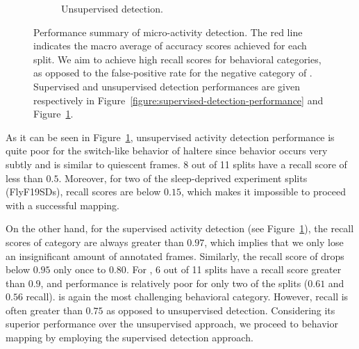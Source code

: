\begin{figure}[htb!]
\begin{subfigure}[b]{0.495\linewidth}
		\caption{Unsupervised detection. \label{figure:unsupervised-detection-performance}}
	\end{subfigure}%
	\caption[Performance summary of micro-activity detection.]{Performance summary of micro-activity detection.
		The red line indicates the macro average of accuracy scores achieved for each split.
		We aim to achieve high recall scores for behavioral categories, as opposed to the false-positive rate for the negative category of \QuiescentOther.
		Supervised and unsupervised detection performances are given respectively in Figure~\ref{figure:supervised-detection-performance} and Figure~\ref{figure:unsupervised-detection-performance}. \label{figure:detection-performance}}
\end{figure}

As it can be seen in Figure~\ref{figure:unsupervised-detection-performance}, unsupervised activity detection performance is quite poor for the switch-like behavior of haltere since \HaltereSwitch behavior occurs very subtly and is similar to quiescent frames.
8 out of 11 splits have a \HaltereSwitch recall score of less than $0.5$.
Moreover, for two of the sleep-deprived experiment splits (FlyF19SDs), \ProboscisPumping recall scores are below $0.15$, which makes it impossible to proceed with a successful mapping.

On the other hand, for the supervised activity detection (see Figure~\ref{figure:unsupervised-detection-performance}), the recall scores of \ProboscisPumping category are always greater than $0.97$, which implies that we only lose an insignificant amount of annotated frames.
Similarly, the recall score of \Feeding drops below $0.95$ only once to $0.80$.
For \ProboscisPumping, 6 out of 11 splits have a recall score greater than $0.9$, and performance is relatively poor for only two of the splits ($0.61$ and $0.56$ recall).
\CHaltereSwitch is again the most challenging behavioral category. However, recall is often greater than $0.75$ as opposed to unsupervised detection.
Considering its superior performance over the unsupervised approach, we proceed to behavior mapping by employing the supervised detection approach.

